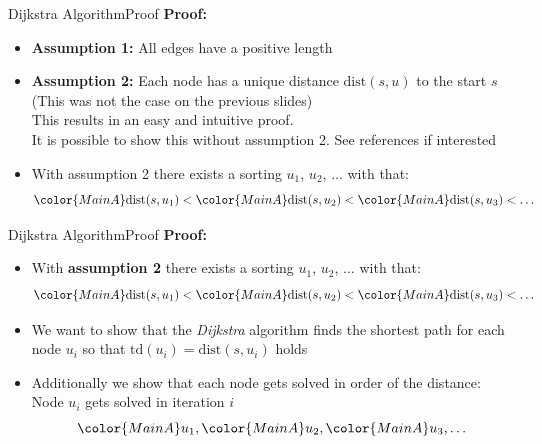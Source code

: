 \begin{frame}{Dijkstra Algorithm}{Proof}
  \textbf{Proof:}
  \begin{itemize}
    \item
      \textbf{Assumption 1:}
      All edges have a positive length
    \item
      \textbf{Assumption 2:}
      Each node has a unique distance
      {\color{MainA}$\mathrm{dist}(s, u)$} to the start {\color{MainA}$s$}\\
      {\color{gray}(This was not the case on the previous slides)}\\[0.5em]
      This results in an easy and intuitive proof.\\
      {\color{gray}
        It is possible to show this without assumption 2.
        See references if interested}
      \vspace{1.0em}
    \item
      With assumption 2 there exists a sorting {\color{MainA}$u_1$},
      {\color{MainA}$u_2$}, $\ldots$ with that:
      \begin{displaymath}
        {\color{MainA}\mathrm{dist}(s, u_1)} <
        {\color{MainA}\mathrm{dist}(s, u_2)} <
        {\color{MainA}\mathrm{dist}(s, u_3)} <
        \ldots
      \end{displaymath}
  \end{itemize}
\end{frame}


\begin{frame}{Dijkstra Algorithm}{Proof}
  \textbf{Proof:}
  \begin{itemize}
    \item
      With \textbf{assumption 2} there exists a sorting {\color{MainA}$u_1$},
      {\color{MainA}$u_2$}, $\ldots$ with that:
      \begin{displaymath}
        {\color{MainA}\mathrm{dist}(s, u_1)} <
        {\color{MainA}\mathrm{dist}(s, u_2)} <
        {\color{MainA}\mathrm{dist}(s, u_3)} <
        \ldots
      \end{displaymath}
    \item
      We want to show that the \textit{Dijkstra} algorithm finds the shortest
      path for each node {\color{MainA}$u_i$} so that
      {\color{MainA}$\mathrm{td}(u_i) = \mathrm{dist}(s, u_i)$} holds
    \item
      Additionally we show that each node gets solved in order of the distance:
      Node {\color{MainA}$u_i$} gets solved in iteration
      {\color{MainA}$i$}
      \begin{displaymath}
        {\color{MainA}u_1},
        {\color{MainA}u_2},
        {\color{MainA}u_3},
        \ldots
      \end{displaymath}
  \end{itemize}
\end{frame}

